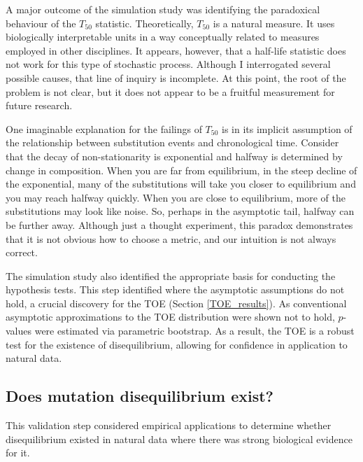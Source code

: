 A major outcome of the simulation study was identifying the paradoxical behaviour of the $T_{50}$ statistic. Theoretically, $T_{50}$ is a natural measure. It uses biologically interpretable units in a way conceptually related to measures employed in other disciplines. It appears, however, that a half-life statistic does not work for this type of stochastic process. Although I interrogated several possible causes, that line of inquiry is incomplete. At this point, the root of the problem is not clear, but it does not appear to be a fruitful measurement for future research. 

One imaginable explanation for the failings of $T_{50}$ is in its implicit assumption of the relationship between substitution events and chronological time. Consider that the decay of non-stationarity is exponential and halfway is determined by change in composition. When you are far from equilibrium, in the steep decline of the exponential, many of the substitutions will take you closer to equilibrium and you may reach halfway quickly. When you are close to equilibrium, more of the substitutions may look like noise. So, perhaps in the asymptotic tail, halfway can be further away. Although just a thought experiment, this paradox demonstrates that it is not obvious how to choose a metric, and our intuition is not always correct. 

The simulation study also identified the appropriate basis for conducting the hypothesis tests. This step identified where the asymptotic assumptions do not hold, a crucial discovery for the TOE (Section \ref{TOE_results}). As conventional asymptotic approximations to the TOE distribution were shown not to hold, $p$-values were estimated via parametric bootstrap. As a result, the TOE is a robust test for the existence of disequilibrium, allowing for confidence in application to natural data. 

\subsection{Does mutation disequilibrium exist?}

This validation step considered empirical applications to determine whether disequilibrium existed in natural data where there was strong biological evidence for it.

